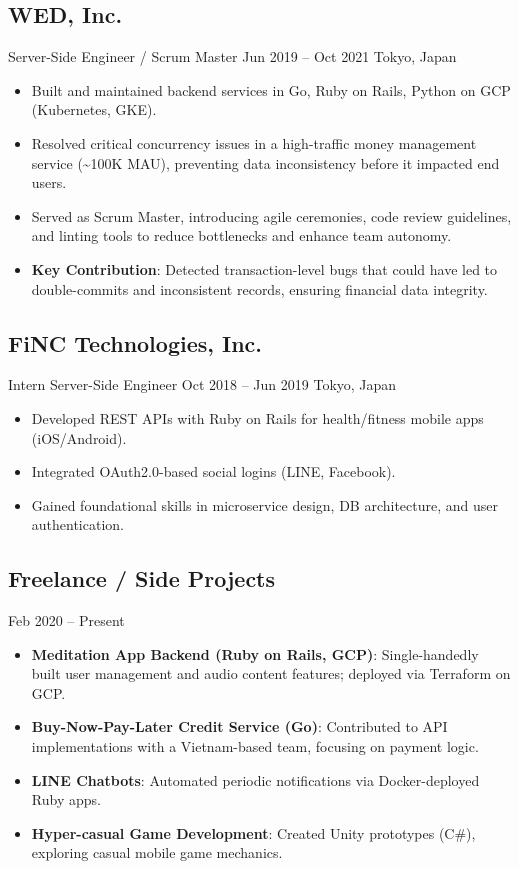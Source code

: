\documentclass[11pt,a4paper]{moderncv}
\begin{document}
\subsection{WED, Inc.}
\cventry
    {Server-Side Engineer / Scrum Master}
    {Jun 2019 -- Oct 2021}
    {Tokyo, Japan}
    {}
    {
      \begin{itemize}
        \item Built and maintained backend services in Go, Ruby on Rails, Python on GCP (Kubernetes, GKE).
        \item Resolved critical concurrency issues in a high-traffic money management service (\textasciitilde100K MAU), preventing data inconsistency before it impacted end users.
        \item Served as Scrum Master, introducing agile ceremonies, code review guidelines, and linting tools to reduce bottlenecks and enhance team autonomy.
        \item \textbf{Key Contribution}: Detected transaction-level bugs that could have led to double-commits and inconsistent records, ensuring financial data integrity.
      \end{itemize}
    }

\subsection{FiNC Technologies, Inc.}
\cventry
    {Intern Server-Side Engineer}
    {Oct 2018 -- Jun 2019}
    {Tokyo, Japan}
    {}
    {
      \begin{itemize}
        \item Developed REST APIs with Ruby on Rails for health/fitness mobile apps (iOS/Android).
        \item Integrated OAuth2.0-based social logins (LINE, Facebook).
        \item Gained foundational skills in microservice design, DB architecture, and user authentication.
      \end{itemize}
    }

\subsection{Freelance / Side Projects}
\cventry
    {}
    {Feb 2020 -- Present}
    {}
    {}
    {
      \begin{itemize}
        \item \textbf{Meditation App Backend (Ruby on Rails, GCP)}:
        Single-handedly built user management and audio content features; deployed via Terraform on GCP.
        \item \textbf{Buy-Now-Pay-Later Credit Service (Go)}:
        Contributed to API implementations with a Vietnam-based team, focusing on payment logic.
        \item \textbf{LINE Chatbots}:
        Automated periodic notifications via Docker-deployed Ruby apps.
        \item \textbf{Hyper-casual Game Development}:
        Created Unity prototypes (C\#), exploring casual mobile game mechanics.
      \end{itemize}
    }
\end{document}
